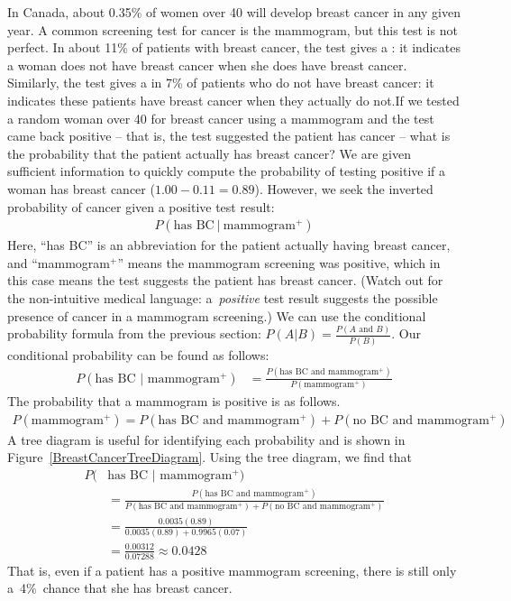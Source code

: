 \begin{examplewrap}
\begin{nexample}{In Canada, about 0.35\% of women over 40 will develop breast cancer in any given year. A common screening test for cancer is the mammogram, but this test is not perfect. In about 11\% of patients with breast cancer, the test gives a : it indicates a woman does not have breast cancer when she does have breast cancer. Similarly, the test gives a  in 7\% of patients who do not have breast cancer: it indicates these patients have breast cancer when they actually do not.\footnotemark If we tested a random woman over 40 for breast cancer using a mammogram and the test came back positive -- that is, the test suggested the patient has cancer -- what is the probability that the patient actually has breast cancer?}\label{probabilityOfBreastCancerGivenPositiveTestExample}
We are given sufficient information to quickly compute the probability of testing positive if a woman has breast cancer ($1.00 - 0.11 = 0.89$). However, we seek the inverted probability of cancer given a positive test result:
\begin{align*}
P(\text{has BC}\ |\ \text{mammogram$^+$})
\end{align*}
Here, ``has BC'' is an abbreviation for the patient actually having breast cancer, and ``mammogram$^+$'' means the mammogram screening was positive, which in this case means the test suggests the patient has breast cancer. (Watch out for the non-intuitive medical language: a~\emph{positive} test result suggests the possible presence of cancer in a mammogram screening.) We can use the conditional probability formula from the previous section: $P(A|B) = \frac{P(A \text{ and } B)}{P(B)}$. Our conditional probability can be found as follows:
\begin{align*}
P(\text{has BC $|$ mammogram$^+$}) &=  \frac{P(\text{has BC and mammogram$^+$})}{P(\text{mammogram$^+$})}
\end{align*}
The probability that a mammogram is positive is as follows.
\begin{align*}
P(\text{mammogram$^+$})=P(\text{has BC and mammogram$^+$}) +  P(\text{no BC and mammogram$^+$})
\end{align*}
A tree diagram is useful for identifying each probability and is shown in Figure~\ref{BreastCancerTreeDiagram}. Using the tree diagram, we find that
\begin{align*}
P(&\text{has BC $|$ mammogram$^+$}) \\
&= \frac{P(\text{has BC and mammogram$^+$})}{P(\text{has BC and mammogram$^+$}) +  P(\text{no BC and mammogram$^+$})} \\
&= \frac{0.0035(0.89)}{0.0035(0.89)+0.9965(0.07)}\\
&= \frac{0.00312}{0.07288}\approx 0.0428
\end{align*}
That is, even if a patient has a positive mammogram screening, there is still only a~4\%~chance that she has breast cancer.
\end{nexample}
\end{examplewrap}
